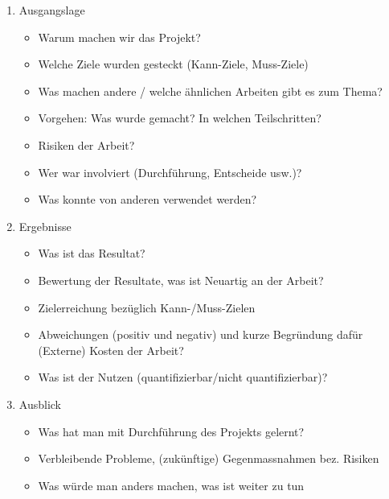 \begin{enumerate}
\item Ausgangslage
	\begin{itemize}
 		\item Warum machen wir das Projekt?
		\item Welche Ziele wurden gesteckt (Kann-Ziele, Muss-Ziele)
		\item Was machen andere / welche ähnlichen Arbeiten gibt es zum Thema?
		\item Vorgehen: Was wurde gemacht? In welchen Teilschritten?
		\item Risiken der Arbeit?
		\item Wer war involviert (Durchführung, Entscheide usw.)?
		\item Was konnte von anderen verwendet werden?
	\end{itemize}
\item Ergebnisse
	\begin{itemize}
 		\item Was ist das Resultat? 
 		\item Bewertung der Resultate, was ist Neuartig an der Arbeit?
 		\item Zielerreichung bezüglich Kann-/Muss-Zielen
 		\item Abweichungen (positiv und negativ) und kurze Begründung dafür (Externe) Kosten der Arbeit?
 		\item Was ist der Nutzen (quantifizierbar/nicht quantifizierbar)?
	\end{itemize}
\item Ausblick
	\begin{itemize}
 		\item Was hat man mit Durchführung des Projekts gelernt?
 		\item Verbleibende Probleme, (zukünftige) Gegenmassnahmen bez. Risiken
 		\item Was würde man anders machen, was ist weiter zu tun
 	\end{itemize}
\end{enumerate}